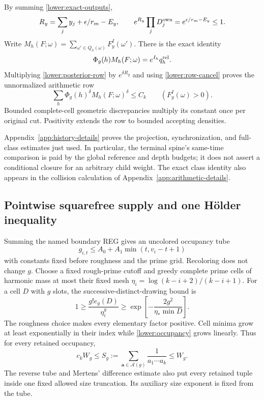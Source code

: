 By summing \eqref{lower:exact-outputs},
\begin{equation}
 R_y=\sum_j y_j+\epsilon/r_m-E_y,
 \qquad e^{R_y}\prod_jD_j^{\rm own}
             =e^{\epsilon/r_m-E_y}\leq1.
 \label{lower:row-cancel}
\end{equation}
Write $M_h(F;\omega)=\sum_{\omega'\in Q_h(\omega)}F_y^I(\omega')$.
There is the exact identity
\begin{equation}
 \Phi_g(h)M_h(F;\omega)=e^{I_h}q_h^{\rm rel}.
 \label{lower:class-exact}
\end{equation}
Multiplying \eqref{lower:posterior-row} by $e^{\delta R_y}$ and using
\eqref{lower:row-cancel} proves the unnormalized arithmetic row
\begin{equation}
 \sum_h\Phi_g(h)^\delta M_h(F;\omega)^\delta\leq C_k
                   \qquad(F_y^I(\omega)>0).
 \label{lower:unnormalized-row}
\end{equation}
Bounded complete-cell geometric discrepancies multiply its constant
once per original cut.  Positivity extends the row to bounded accepting
densities.

Appendix~\ref{app:history-details} proves the projection, synchronization,
and full-class estimates just used. In particular, the terminal spine's
same-time comparison is paid by the global reference and depth budgets;
it does not assert a conditional closure for an arbitrary child weight.
The exact class identity also appears in the collision calculation of
Appendix~\ref{app:arithmetic-details}.

\subsection{Pointwise squarefree supply and one H\"older inequality}
\label{lower:arithmetic}
Summing the named boundary REG gives an uncolored occupancy tube
\begin{equation}
 g_{i,t}\leq A_0+A_1\min(t,v_i-t+1)
 \label{lower:occupancy}
\end{equation}
with constants fixed before roughness and the prime grid.  Recoloring
does not change $g$.  Choose a fixed rough-prime cutoff and greedy
complete prime cells of harmonic mass at most their fixed mesh
$\eta_i=\log(k-i+2)/(k-i+1)$.
For a cell $D$ with $g$ slots, the successive-distinct-drawing bound is
\begin{equation}
 1\geq\frac{g!e_g(D)}{\eta_i^g}
       \geq\exp\left[-\frac{2g^2}{\eta_*\min D}\right].
 \label{lower:squarefree}
\end{equation}
The roughness choice makes every elementary factor positive.  Cell
minima grow at least exponentially in their index while
\eqref{lower:occupancy} grows linearly.  Thus for every retained occupancy,
\begin{equation}
 c_k W_g\leq S_g:=\sum_{\mathbf a\in\mathcal A(g)}
                 \frac1{a_1\cdots a_k}\leq W_g.
 \label{lower:actual-supply}
\end{equation}
The reverse tube and Mertens' difference estimate also put every
retained tuple inside one fixed allowed size truncation.  Its auxiliary
size exponent is fixed from the tube.

